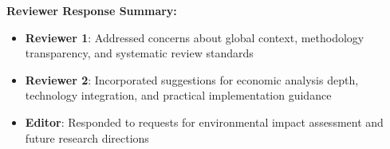 \documentclass[12pt,a4paper]{article}
\begin{document}
\textbf{Reviewer Response Summary:}
\begin{itemize}
\item \textbf{Reviewer 1}: Addressed concerns about global context, methodology transparency, and systematic review standards
\item \textbf{Reviewer 2}: Incorporated suggestions for economic analysis depth, technology integration, and practical implementation guidance
\item \textbf{Editor}: Responded to requests for environmental impact assessment and future research directions
\end{itemize}

% 
% 
\end{document}

